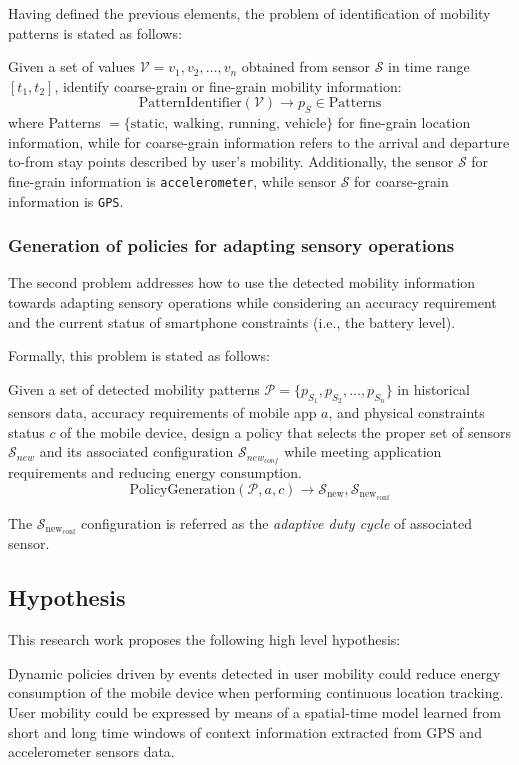 \documentclass[ENG,PhD]{cinvestav}
\begin{document}
Having defined the previous elements, the problem of identification of mobility patterns is stated as follows:
\begin{displayquote}
Given a set of values $\mathcal{V} = v_1,v_2,\ldots,v_n$ obtained from sensor $\mathcal{S}$ in time range $[t_1,t_2]$, identify coarse-grain or fine-grain mobility information:
$$
\text{PatternIdentifier}(\mathcal{V}) \rightarrow p_S \in \text{Patterns}
$$
where Patterns  $ = \{ \text{static, walking, running, vehicle} \}$ for fine-grain location information, while for coarse-grain information refers to the arrival and departure to-from stay points described by user's mobility.
Additionally, the sensor $\mathcal{S}$ for fine-grain information is \verb|accelerometer|, while sensor $\mathcal{S}$ for coarse-grain information is \verb|GPS|.
\end{displayquote}

\subsubsection{Generation of policies for adapting sensory operations}
The second problem addresses how to use the detected mobility information towards adapting sensory operations while considering an accuracy requirement and the current status of smartphone constraints (i.e., the battery level).

Formally, this problem is stated as follows:
\begin{displayquote}
Given a set of detected mobility patterns $\mathcal{P} = \{ p_{S_1}, p_{S_2}, \ldots, p_{S_n} \}$ in historical sensors data, accuracy requirements of mobile app $a$, and physical constraints status $c$ of the mobile device, design a policy that selects the proper set of sensors $\mathcal{S}_{new}$ and its associated configuration $\mathcal{S}_{new_{conf}}$  while meeting application requirements and reducing energy consumption.
$$
  \text{PolicyGeneration}( \mathcal{P}, a, c ) \longrightarrow{} \mathcal{S}_{\text{new}}, \mathcal{S}_{\text{new}_{\text{conf}}}
$$

The $\mathcal{S}_{\text{new}_{\text{conf}}}$ configuration is referred as the \emph{adaptive duty cycle} of associated sensor.
\end{displayquote}


\subsection{Hypothesis}
This research work proposes the following high level hypothesis:
\begin{displayquote}
  Dynamic policies driven by events detected in user mobility could reduce energy consumption of the mobile device when performing continuous location tracking.
  User mobility could be expressed by means of a spatial-time model learned from short and long time windows of context information extracted from GPS and accelerometer sensors data.
\end{displayquote}
\end{document}

